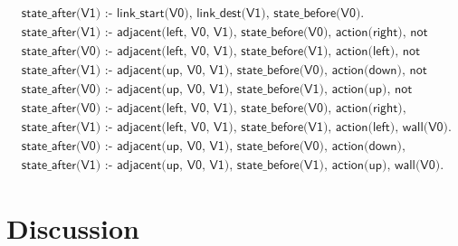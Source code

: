 \begin{equation}
\begin{split}
&\textsf{state\_after(V1) :- link\_start(V0), link\_dest(V1), state\_before(V0).}\\
&\textsf{state\_after(V1) :- adjacent(left, V0, V1), state\_before(V0), action(right), not wall(V1).}\\
&\textsf{state\_after(V0) :- adjacent(left, V0, V1), state\_before(V1), action(left), not wall(V0).}\\
&\textsf{state\_after(V1) :- adjacent(up, V0, V1), state\_before(V0), action(down), not wall(V1).}\\
&\textsf{state\_after(V0) :- adjacent(up, V0, V1), state\_before(V1), action(up), not wall(V0).}\\
&\textsf{state\_after(V0) :- adjacent(left, V0, V1), state\_before(V0), action(right), wall(V1).}\\
&\textsf{state\_after(V1) :- adjacent(left, V0, V1), state\_before(V1), action(left), wall(V0).}\\
&\textsf{state\_after(V0) :- adjacent(up, V0, V1), state\_before(V0), action(down), wall(V1).}\\
&\textsf{state\_after(V1) :- adjacent(up, V0, V1), state\_before(V1), action(up), wall(V0).}
\end{split}
\label{experiment4_ilasp}
\end{equation}





\section{Discussion}

